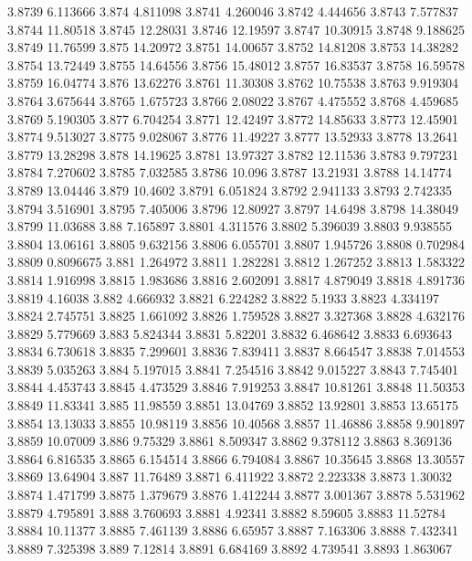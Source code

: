 3.8739  6.113666
3.874  4.811098
3.8741  4.260046
3.8742  4.444656
3.8743  7.577837
3.8744  11.80518
3.8745  12.28031
3.8746  12.19597
3.8747  10.30915
3.8748  9.188625
3.8749  11.76599
3.875  14.20972
3.8751  14.00657
3.8752  14.81208
3.8753  14.38282
3.8754  13.72449
3.8755  14.64556
3.8756  15.48012
3.8757  16.83537
3.8758  16.59578
3.8759  16.04774
3.876  13.62276
3.8761  11.30308
3.8762  10.75538
3.8763  9.919304
3.8764  3.675644
3.8765  1.675723
3.8766  2.08022
3.8767  4.475552
3.8768  4.459685
3.8769  5.190305
3.877  6.704254
3.8771  12.42497
3.8772  14.85633
3.8773  12.45901
3.8774  9.513027
3.8775  9.028067
3.8776  11.49227
3.8777  13.52933
3.8778  13.2641
3.8779  13.28298
3.878  14.19625
3.8781  13.97327
3.8782  12.11536
3.8783  9.797231
3.8784  7.270602
3.8785  7.032585
3.8786  10.096
3.8787  13.21931
3.8788  14.14774
3.8789  13.04446
3.879  10.4602
3.8791  6.051824
3.8792  2.941133
3.8793  2.742335
3.8794  3.516901
3.8795  7.405006
3.8796  12.80927
3.8797  14.6498
3.8798  14.38049
3.8799  11.03688
3.88  7.165897
3.8801  4.311576
3.8802  5.396039
3.8803  9.938555
3.8804  13.06161
3.8805  9.632156
3.8806  6.055701
3.8807  1.945726
3.8808  0.702984
3.8809  0.8096675
3.881  1.264972
3.8811  1.282281
3.8812  1.267252
3.8813  1.583322
3.8814  1.916998
3.8815  1.983686
3.8816  2.602091
3.8817  4.879049
3.8818  4.891736
3.8819  4.16038
3.882  4.666932
3.8821  6.224282
3.8822  5.1933
3.8823  4.334197
3.8824  2.745751
3.8825  1.661092
3.8826  1.759528
3.8827  3.327368
3.8828  4.632176
3.8829  5.779669
3.883  5.824344
3.8831  5.82201
3.8832  6.468642
3.8833  6.693643
3.8834  6.730618
3.8835  7.299601
3.8836  7.839411
3.8837  8.664547
3.8838  7.014553
3.8839  5.035263
3.884  5.197015
3.8841  7.254516
3.8842  9.015227
3.8843  7.745401
3.8844  4.453743
3.8845  4.473529
3.8846  7.919253
3.8847  10.81261
3.8848  11.50353
3.8849  11.83341
3.885  11.98559
3.8851  13.04769
3.8852  13.92801
3.8853  13.65175
3.8854  13.13033
3.8855  10.98119
3.8856  10.40568
3.8857  11.46886
3.8858  9.901897
3.8859  10.07009
3.886  9.75329
3.8861  8.509347
3.8862  9.378112
3.8863  8.369136
3.8864  6.816535
3.8865  6.154514
3.8866  6.794084
3.8867  10.35645
3.8868  13.30557
3.8869  13.64904
3.887  11.76489
3.8871  6.411922
3.8872  2.223338
3.8873  1.30032
3.8874  1.471799
3.8875  1.379679
3.8876  1.412244
3.8877  3.001367
3.8878  5.531962
3.8879  4.795891
3.888  3.760693
3.8881  4.92341
3.8882  8.59605
3.8883  11.52784
3.8884  10.11377
3.8885  7.461139
3.8886  6.65957
3.8887  7.163306
3.8888  7.432341
3.8889  7.325398
3.889  7.12814
3.8891  6.684169
3.8892  4.739541
3.8893  1.863067
